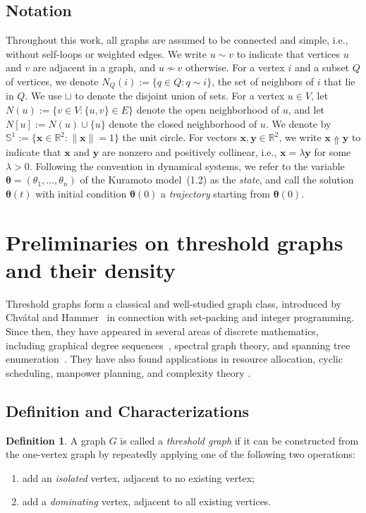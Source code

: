 \documentclass[11pt,reqno]{amsart}
\theoremstyle{definition}
\newtheorem{definition}[theorem]{Definition}
\begin{document}
\subsection{Notation}
Throughout this work, all graphs are assumed to be connected and simple, i.e., without self-loops or weighted edges. We write $u \sim v$ to indicate that vertices $u$ and $v$ are adjacent in a graph, and $u \not\sim v$ otherwise. For a vertex $i$ and a subset $Q$ of vertices, we denote $N_Q(i) := \{ q \in Q : q \sim i \}$, the set of neighbors of $i$ that lie in $Q$. We use $\sqcup$ to denote the disjoint union of sets. For a vertex $u\in V$, let $N(u):=\{v\in V:\{u,v\}\in E\}$ denote the open neighborhood of $u$, and let $N[u]:=N(u)\cup\{u\}$ denote the closed neighborhood of $u$.
We denote by $\mathbb{S}^1 := \{ \boldsymbol x \in \mathbb{R}^2 : \|\boldsymbol x\| = 1 \}$ the unit circle. For vectors $\boldsymbol x, \boldsymbol y \in \mathbb{R}^2$, we write $\boldsymbol x \Uparrow \boldsymbol y$ to indicate that $\boldsymbol x$ and $\boldsymbol y$ are nonzero and positively collinear, i.e., $\boldsymbol x = \lambda \boldsymbol y$ for some $\lambda > 0$.
Following the convention in dynamical systems, we refer to the variable $\boldsymbol{\theta} = (\theta_1,\ldots,\theta_n)$ of the Kuramoto model~(1.2) as the \emph{state}, and call the solution $\boldsymbol{\theta}(t)$ with initial condition $\boldsymbol{\theta}(0)$ a \emph{trajectory} starting from $\boldsymbol{\theta}(0)$.
\section{Preliminaries on threshold graphs and their density}\label{sec:threshold}
Threshold graphs form a classical and well-studied graph class, introduced by Chvátal and Hammer~\cite{ChvatalHammer1977} in connection with set-packing and integer programming.
Since then, they have appeared in several areas of discrete mathematics, including graphical degree sequences~\cite{CH73}, spectral graph theory, and spanning tree enumeration~\cite{HammerKelmans1996}.
They have also found applications in resource allocation, cyclic scheduling, manpower planning, and complexity theory \cite{MahadevPeled1995}.

\subsection{Definition and Characterizations}
\begin{definition}\label{def:threshold}
A graph $G$ is called a \emph{threshold graph} if it can be constructed from
the one-vertex graph by repeatedly applying one of the following two
operations:
\begin{enumerate}
    \item[(i)] add an \emph{isolated} vertex, adjacent to no existing vertex;
    \item[(ii)] add a \emph{dominating} vertex, adjacent to all existing
    vertices.
\end{enumerate}
\end{definition}
\end{document}
